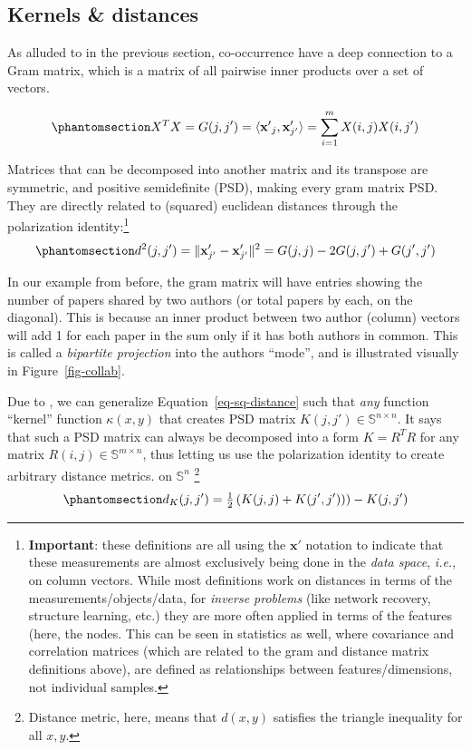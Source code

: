 \documentclass[%
	12pt,
		oneside,
		letterpaper
]{book}
\begin{document}
\subsection{Kernels \& distances}\label{kernels-distances}

As alluded to in the previous section, co-occurrence have a deep connection to a Gram matrix, which is a matrix of all pairwise inner products over a set of vectors.

\begin{equation}\phantomsection\label{eq-gram-mat}{
X^TX=G(j,j')=\langle\mathbf{x'}_j,\mathbf{x}_{j'}'\rangle = \sum_{i=1}^{m} X(i,j)X(i,j')
}\end{equation}

Matrices that can be decomposed into another matrix and its transpose are symmetric, and positive semidefinite (PSD), making every gram matrix PSD.
They are directly related to (squared) euclidean distances through the polarization identity:\footnote{\textbf{Important}: these definitions are all using the \(\mathbf{x}'\) notation to indicate that these measurements are almost exclusively being done in the \emph{data space}, \emph{i.e.}, on column vectors.
  While most definitions work on distances in terms of the measurements/objects/data, for \emph{inverse problems} (like network recovery, structure learning, etc.) they are more often applied in terms of the features (here, the nodes.
  This can be seen in statistics as well, where covariance and correlation matrices (which are related to the gram and distance matrix definitions above), are defined as relationships between features/dimensions, not individual samples.}
\begin{equation}\phantomsection\label{eq-sq-distance}{
d^2(j,j') = \|\mathbf{x}_{j'}'-\mathbf{x}_{j'}'\|^2 = G(j,j) - 2G(j,j') + G(j',j') 
}\end{equation}

In our example from before, the gram matrix will have entries showing the number of papers shared by two authors (or total papers by each, on the diagonal).
This is because an inner product between two author (column) vectors will add 1 for each paper in the sum only if it has both authors in common.
This is called a \emph{bipartite projection}\autocite{Bipartitenetworkprojection_Zhou2007,atlasaspiringnetwork_Coscia2021} into the authors ``mode'', and is illustrated visually in Figure~\ref{fig-collab}.

Due to \autocite{Metricspacespositive_Schoenberg1938}, we can generalize Equation~\ref{eq-sq-distance} such that \emph{any} function ``kernel'' function \(\kappa(x,y)\) that creates PSD matrix \(K(j,j')\in\mathbb{S}^{n\times n}\).
It says that such a PSD matrix can always be decomposed into a form \(K=R^TR\) for any matrix \(R(i,j)\in \mathbb{S}^{m\times n}\), thus letting us use the polarization identity to create arbitrary distance metrics. on \(\mathbb{S}^n\) \autocite{SimilaritiesgraphsKernels_Avrachenkov2019}\footnote{
  Distance metric, here, means that \(d(x,y)\) satisfies the triangle inequality for all \(x,y\).}
\begin{equation}\phantomsection\label{eq-dist-kernel}{
d_K(j,j') = \tfrac{1}{2}\left(K(j,j)+K(j',j'))\right)-K(j,j')
}\end{equation}
\end{document}
